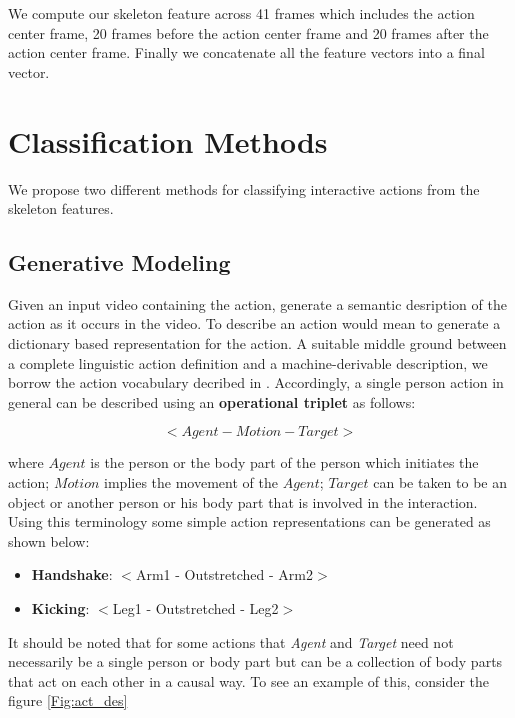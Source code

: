 \documentclass[10pt,twocolumn,letterpaper]{article}
\begin{document}
We compute our skeleton feature across 41 frames which includes the action center frame, 20 frames before the action center frame and 20 frames after the action center frame. Finally we concatenate all the feature vectors into a final vector.

\section{Classification Methods}
We propose two different methods for classifying interactive actions from the skeleton features.

\subsection{Generative Modeling}
Given an input video containing the action, generate a semantic desription of the action as it occurs in the video. To describe an action would mean to generate a dictionary based representation for the action. A suitable middle ground between a complete linguistic action definition and a machine-derivable description, we borrow the action vocabulary decribed in \cite{SUHA}. Accordingly, a single person action in general can be described using an \textbf{operational triplet} as follows:

\begin{equation}
<Agent-Motion-Target>
\end{equation}

where $Agent$ is the person or the body part of the person which initiates the action; $Motion$ implies the movement of the $Agent$; $Target$ can be taken to be an object or another person or his body part that is involved in the interaction. Using this terminology some simple action representations can be generated as shown below:

\begin{itemize}
\item \textbf{Handshake}: $<$Arm1 - Outstretched - Arm2$>$
\item \textbf{Kicking}: $<$Leg1 - Outstretched - Leg2$>$
\end{itemize}

It should be noted that for some actions that \textit{Agent} and \textit{Target} need not necessarily be a single person or body part but can be a collection of body parts that act on each other in a causal way. To see an example of this, consider the figure \ref{Fig:act_des}
\end{document}
